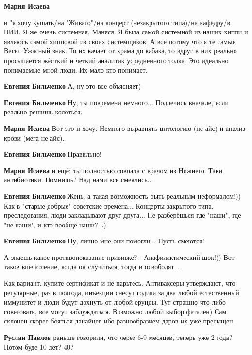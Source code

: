 \begin{itemize}
\begin{itemize} %
\textbf{Мария Исаева} 

и "я хочу кушать/на "Живаго"/на концерт (незакрытого типа)/на кафедру/в НИИ. Я
же очень системная, Маняся. Я была самой системной из наших хиппи и являюсь
самой хипповой из своих системщиков. А все потому что я те самые Весы. Ужасный
знак. То их качает от храма до кабака, то вдруг в них реально просыпается
жёсткий и четкий аналитик усредненного толка. Это идеально понимаемые мной
люди. Их мало кто понимает.

\textbf{Евгения Бильченко} А, ну это все объясняет)

\textbf{Евгения Бильченко} Ну, ты повремени немного... Подлечись вначале, если реально решишь колоться.

\textbf{Мария Исаева} Вот это и хочу. Немного выравнять цитологию (не айс) и анализ крови (мега не айс).

\textbf{Евгения Бильченко} Правильно!

\textbf{Мария Исаева} и ещё: ты полностью совпала с врачом из Нижнего. Таки антибиотики. Помнишь? Над нами все смеялись...

\textbf{Евгения Бильченко} Жень, а такая возможность быть реальным неформалом!)) Как в "старые добрые" советские времена... Концерты закрытого типа, преследования, люди закладывают друг друга... Не разберёшься где "наши", где "не наши", и кто вообще наши?...)

\textbf{Евгения Бильченко} Ну, лично мне они помогли... Пусть смеются!

А знаешь какое противопоказание прививке? - Анафилактический шок!)) Вот такое впечатление, когда он случиться, тогда и освободят...
\end{itemize} %


Как вариант, купите сертификат и не парьтесь. Антиваксеры утверждают, что
регулярные, раз в полгода, инъекции снесут годика за два любой естественный
иммунитет и люди будут дохнуть от любой ерунды. Тут страшно что-либо
советовать, все могут заблуждаться. Возможно любой выбор фатален) Сам склонен
скорее бояться данайцев ибо разнообразием даров их уже пресыщен.

\begin{itemize} %
\textbf{Руслан Павлов} раньше говорили, что через 6-9 месяцев, теперь уже 2 года?
Потом буде 10 лет? 40?


\end{itemize}
\end{itemize}
